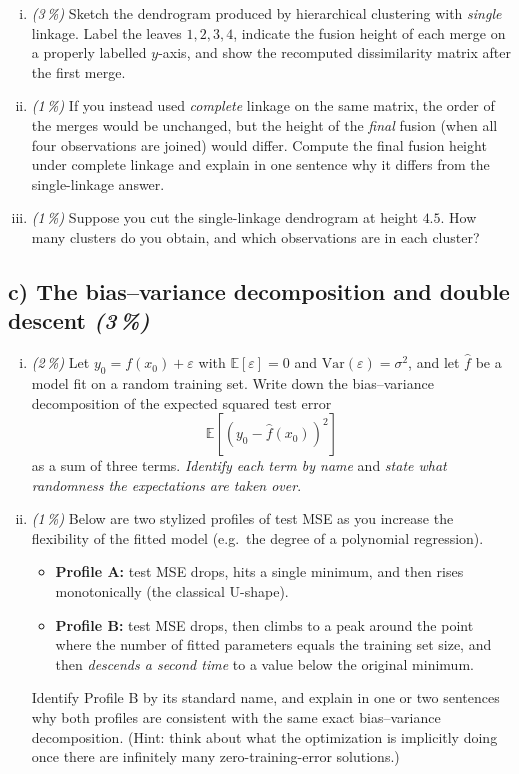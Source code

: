 \documentclass[11pt,a4paper]{article}
\newcommand{\subpoints}[1]{\textit{(#1\,\%)}}
\begin{document}
\begin{enumerate}[(i)]
  \item \subpoints{3} Sketch the dendrogram produced by hierarchical clustering with \emph{single} linkage. Label the leaves $1, 2, 3, 4$, indicate the fusion height of each merge on a properly labelled $y$-axis, and show the recomputed dissimilarity matrix after the first merge.
  \item \subpoints{1} If you instead used \emph{complete} linkage on the same matrix, the order of the merges would be unchanged, but the height of the \emph{final} fusion (when all four observations are joined) would differ. Compute the final fusion height under complete linkage and explain in one sentence why it differs from the single-linkage answer.
  \item \subpoints{1} Suppose you cut the single-linkage dendrogram at height $4.5$. How many clusters do you obtain, and which observations are in each cluster?
\end{enumerate}

\subsection*{c) The bias--variance decomposition and double descent \subpoints{3}}

\begin{enumerate}[(i)]
  \item \subpoints{2} Let $y_0 = f(x_0) + \varepsilon$ with $\mathbb{E}[\varepsilon] = 0$ and $\mathrm{Var}(\varepsilon) = \sigma^2$, and let $\hat f$ be a model fit on a random training set. Write down the bias--variance decomposition of the expected squared test error
$$\mathbb{E}\!\left[(y_0 - \hat f(x_0))^2\right]$$
as a sum of three terms. \emph{Identify each term by name} and \emph{state what randomness the expectations are taken over}.
  \item \subpoints{1} Below are two stylized profiles of test MSE as you increase the flexibility of the fitted model (e.g.\ the degree of a polynomial regression).
  \begin{itemize}
    \item \textbf{Profile A:} test MSE drops, hits a single minimum, and then rises monotonically (the classical U-shape).
    \item \textbf{Profile B:} test MSE drops, then climbs to a peak around the point where the number of fitted parameters equals the training set size, and then \emph{descends a second time} to a value below the original minimum.
  \end{itemize}
  Identify Profile B by its standard name, and explain in one or two sentences why both profiles are consistent with the same exact bias--variance decomposition. (Hint: think about what the optimization is implicitly doing once there are infinitely many zero-training-error solutions.)
\end{enumerate}
\end{document}
